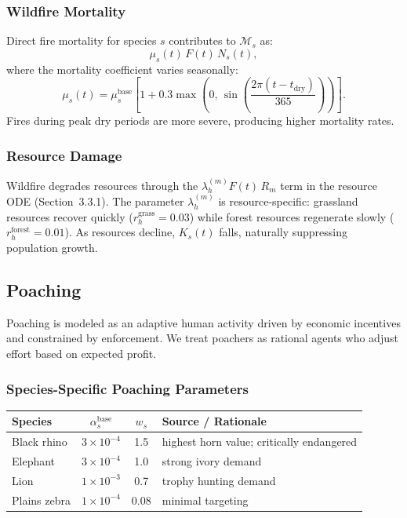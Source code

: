 \subsubsection{Wildfire Mortality}

Direct fire mortality for species $s$ contributes to $\mathcal{M}_s$ as:
\[
\mu_s(t)\,F(t)\,N_s(t),
\]
where the mortality coefficient varies seasonally:
\[
\mu_s(t) = \mu_s^{\text{base}}\left[1 + 0.3\max\!\left(0,\,\sin\!\left(\frac{2\pi(t - t_{\text{dry}})}{365}\right)\right)\right].
\]
Fires during peak dry periods are more severe, producing higher mortality rates.

\subsubsection{Resource Damage}

Wildfire degrades resources through the $\lambda_h^{(m)} F(t)\,R_m$ term in the resource ODE (Section~3.3.1). The parameter $\lambda_h^{(m)}$ is resource-specific: grassland resources recover quickly ($r_h^{\text{grass}} = 0.03$) while forest resources regenerate slowly ($r_h^{\text{forest}} = 0.01$). As resources decline, $K_s(t)$ falls, naturally suppressing population growth.

\subsection{Poaching}

Poaching is modeled as an adaptive human activity driven by economic incentives and constrained by enforcement. We treat poachers as rational agents who adjust effort based on expected profit.

\subsubsection{Species-Specific Poaching Parameters}

\begin{center}
\begin{tabular}{lccl}
\hline
\textbf{Species} & $\alpha_s^{\text{base}}$ & $w_s$ & \textbf{Source / Rationale} \\
\hline
Black rhino & $3 \times 10^{-4}$ & 1.5 & highest horn value; critically endangered \cite{emslie1999rhino} \\
Elephant & $3 \times 10^{-4}$ & 1.0 & strong ivory demand \cite{wittemyer2014ivory} \\
Lion & $1 \times 10^{-3}$ & 0.7 & trophy hunting demand \cite{trinkel2013lions} \\
Plains zebra & $1 \times 10^{-4}$ & 0.08 & minimal targeting \cite{gaillard2000dynamics} \\
\hline
\end{tabular}
\end{center}

